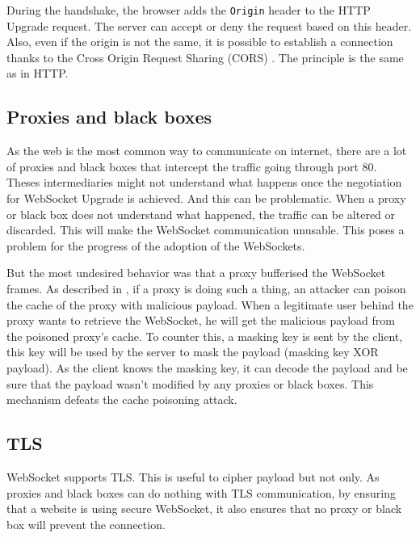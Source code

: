 \documentclass[journal,compsoc]{IEEEtran}
\newcommand{\ttt}[1]{\texttt{#1}}
\newcommand{\ws}{WebSocket}
\begin{document}
During the handshake, the browser adds the \ttt{Origin} header to the HTTP Upgrade request.
The server can accept or deny the request based on this header.
Also, even if the origin is not the same, it is possible to establish a connection thanks to the Cross Origin Request Sharing (CORS) \cite{talkingtoyourself}.
The principle is the same as in HTTP.

\subsection{Proxies and black boxes}
\label{sec:key}
As the web is the most common way to communicate on internet, there are a lot of proxies and black boxes that intercept the traffic going through port 80.
Theses intermediaries might not understand what happens once the negotiation for \ws{} Upgrade is achieved.
And this can be problematic.
When a proxy or black box does not understand what happened, the traffic can be altered or discarded.
This will make the \ws{} communication unusable.
This poses a problem for the progress of the adoption of the \ws s.

But the most undesired behavior was that a proxy bufferised the \ws{} frames.
As described in \cite{talkingtoyourself}, if a proxy is doing such a thing, an attacker can poison the cache of the proxy with malicious payload.
When a legitimate user behind the proxy wants to retrieve the \ws{}, he will get the malicious payload from the poisoned proxy's cache.
To counter this, a masking key is sent by the client, this key will be used by the server to mask the payload (masking key XOR payload).
As the client knows the masking key, it can decode the payload and be sure that the payload wasn't modified by any proxies or black boxes.
This mechanism defeats the cache poisoning attack.

\subsection{TLS}
\ws{} supports TLS.
This is useful to cipher payload but not only.
As proxies and black boxes can do nothing with TLS communication, by ensuring that a website is using secure \ws{}, it also ensures that no proxy or black box will prevent the connection.
\end{document}
